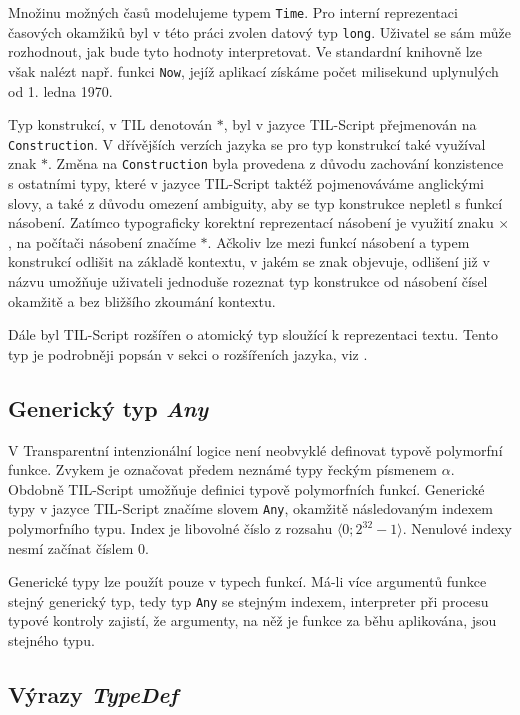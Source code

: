 Množinu možných časů modelujeme typem \lstinline{Time}. Pro interní reprezentaci časových okamžiků
byl v této práci zvolen datový typ \lstinline{long}. Uživatel se sám může rozhodnout, jak bude tyto
hodnoty interpretovat. Ve standardní knihovně lze však nalézt např. funkci \lstinline{Now}, jejíž
aplikací získáme počet milisekund uplynulých od 1. ledna 1970.

Typ konstrukcí, v TIL denotován $*$, byl v jazyce TIL-Script přejmenován
na \lstinline{Construction}. V dřívějších verzích jazyka se pro typ konstrukcí také využíval znak
$*$. Změna na \lstinline{Construction} byla provedena z důvodu zachování konzistence s ostatními
typy, které v jazyce TIL-Script taktéž pojmenováváme anglickými slovy, a také z důvodu omezení
ambiguity, aby se typ konstrukce nepletl s funkcí násobení. Zatímco typograficky korektní
reprezentací násobení je využití znaku $\times$, na počítači násobení značíme $*$. Ačkoliv lze mezi
funkcí násobení a typem konstrukcí odlišit na základě kontextu, v jakém se znak objevuje, odlišení
již v názvu umožňuje uživateli jednoduše rozeznat typ konstrukce od násobení čísel okamžitě a
bez bližšího zkoumání kontextu.

Dále byl TIL-Script rozšířen o atomický typ sloužící k reprezentaci textu. Tento typ je podrobněji
popsán v sekci o rozšířeních jazyka, viz .

\subsection{Generický typ \textit{Any}}

V Transparentní intenzionální logice není neobvyklé definovat typově polymorfní funkce. Zvykem je
označovat předem neznámé typy řeckým písmenem $\alpha$. Obdobně TIL-Script umožňuje definici
typově polymorfních funkcí. Generické typy v jazyce TIL-Script značíme slovem \lstinline{Any},
okamžitě následovaným indexem polymorfního typu. Index je libovolné číslo z rozsahu
$\bigl \langle 0; 2^{32}-1 \bigr \rangle$. Nenulové indexy nesmí začínat číslem 0.

Generické typy lze použít pouze v typech funkcí. Má-li více argumentů funkce stejný generický
typ, tedy typ \lstinline{Any} se stejným indexem, interpreter při procesu typové kontroly zajistí,
že argumenty, na něž je funkce za běhu aplikována, jsou stejného typu.

\subsection{Výrazy \textit{TypeDef}}

